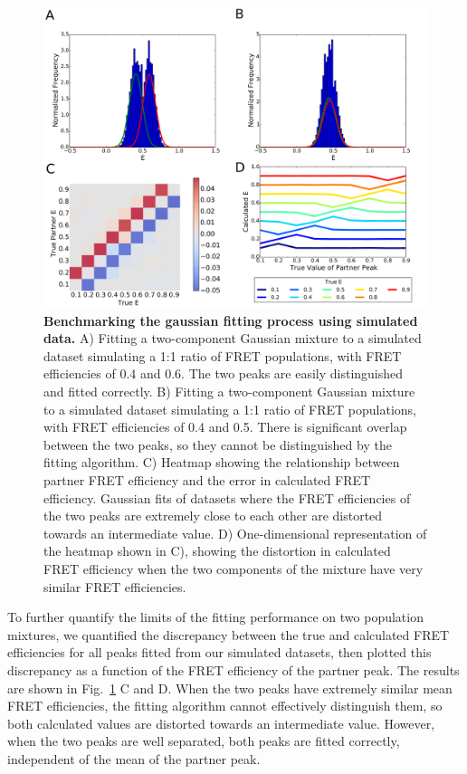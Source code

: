 \begin{figure}[!ht]
   \begin{center}
      \includegraphics*[clip=true, width=6in]{pyFRET/benchmarking.pdf}
      \caption{{\bf Benchmarking the gaussian fitting process using simulated data.} A) Fitting a two-component Gaussian mixture to a simulated dataset simulating a 1:1 ratio of FRET populations, with FRET efficiencies of 0.4 and 0.6. The two peaks are easily distinguished and fitted correctly. B) Fitting a two-component Gaussian mixture to a simulated dataset simulating a 1:1 ratio of FRET populations, with FRET efficiencies of 0.4 and 0.5. There is significant overlap between the two peaks, so they cannot be distinguished by the fitting algorithm. C) Heatmap showing the relationship between partner FRET efficiency and the error in calculated FRET efficiency. Gaussian fits of datasets where the FRET efficiencies of the two peaks are extremely close to each other are distorted towards an intermediate value. D) One-dimensional representation of the heatmap shown in C), showing the distortion in calculated FRET efficiency when the two components of the mixture have very similar FRET efficiencies.}
      \label{fig:fig_benchmarking}
   \end{center}
\end{figure}

To further quantify the limits of the fitting performance on two population mixtures, we quantified the discrepancy between the true and calculated FRET efficiencies for all peaks fitted from our simulated datasets, then plotted this discrepancy as a function of the FRET efficiency of the partner peak. The results are shown in Fig.~\ref{fig:fig_benchmarking} C and D. When the two peaks have extremely similar mean FRET efficiencies, the fitting algorithm cannot effectively distinguish them, so both calculated values are distorted towards an intermediate value. However, when the two peaks are well separated, both peaks are fitted correctly, independent of the mean of the partner peak.

